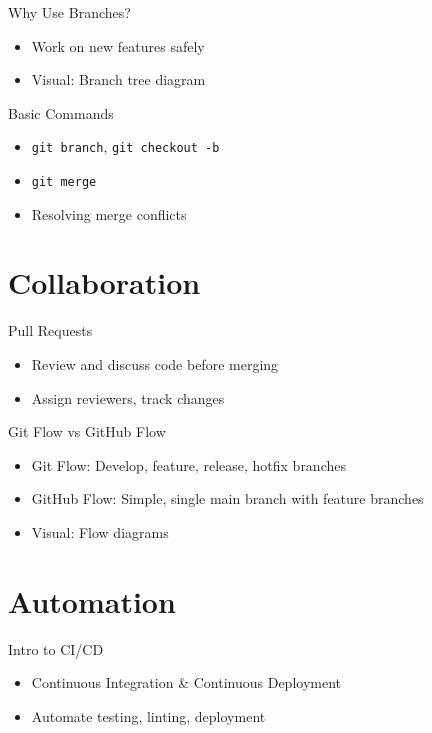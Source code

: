 \documentclass[aspectratio=169]{beamer} %
\begin{document}
\begin{frame}{Why Use Branches?}
  \begin{itemize}
    \item Work on new features safely
    \item Visual: Branch tree diagram
  \end{itemize}
\end{frame}

\begin{frame}{Basic Commands}
  \begin{itemize}
    \item \texttt{git branch}, \texttt{git checkout -b}
    \item \texttt{git merge}
    \item Resolving merge conflicts
  \end{itemize}
\end{frame}

\section{Collaboration}

\begin{frame}{Pull Requests}
  \begin{itemize}
    \item Review and discuss code before merging
    \item Assign reviewers, track changes
  \end{itemize}
\end{frame}

\begin{frame}{Git Flow vs GitHub Flow}
  \begin{itemize}
    \item Git Flow: Develop, feature, release, hotfix branches
    \item GitHub Flow: Simple, single main branch with feature branches
    \item Visual: Flow diagrams
  \end{itemize}
\end{frame}

\section{Automation}

\begin{frame}{Intro to CI/CD}
  \begin{itemize}
    \item Continuous Integration \& Continuous Deployment
    \item Automate testing, linting, deployment
  \end{itemize}
\end{frame}
\end{document}
